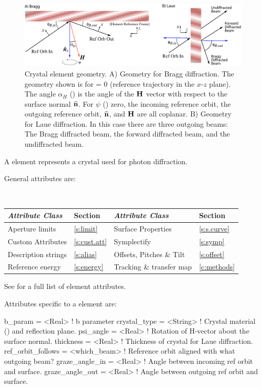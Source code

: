 \begin{figure}[tb]
  \centering
  \includegraphics[width=5in]{crystal-ele.pdf}
  \caption[Crystal element geometry.]
{Crystal element geometry.  A) Geometry for Bragg diffraction. The
geometry shown is for  = 0 (reference trajectory in the
$x$-$z$ plane). The angle $\alpha_H$ () is the angle
of the ${\bf H}$ vector with respect to the surface normal ${\widehat{\bf n}}$. For $\psi$ () zero, the incoming reference orbit,
the outgoing reference orbit, ${\widehat{\bf n}}$, and ${\bf H}$ are all
coplanar. B) Geometry for Laue diffraction. In this case there are
three outgoing beams: The Bragg diffracted beam, the forward
diffracted beam, and the undiffracted beam.}
  \label{f:crystal}
\end{figure}

A  element represents a crystal used for photon diffraction.

General  attributes are:
\begin{center}
\tt
\begin{tabular}{llll} \toprule
  {\sl Attribute Class}      & Section          & {\sl Attribute Class}      & Section         \\ \midrule
  Aperture limits            & \ref{s:limit}    & Surface Properties         & \ref{s:s.curve} \\ 
  Custom Attributes          & \ref{s:cust.att} & Symplectify                & \ref{s:symp}    \\
  Description strings        & \ref{s:alias}    & Offsets, Pitches \& Tilt   & \ref{s:offset}  \\
  Reference energy           & \ref{s:energy}   & Tracking \& transfer map   & \ref{c:methods} \\
  \bottomrule
\end{tabular}
\end{center}
\toffset
See  for a full list of element attributes.

Attributes specific to a  element are:
\begin{example}
  b_param            = <Real>       ! b parameter
  crystal_type       = <String>     ! Crystal material () and reflection plane.
  psi_angle          = <Real>       ! Rotation of H-vector about the surface normal.
  thickness          = <Real>       ! Thickness of crystal for Laue diffraction.
  ref_orbit_follows  = <which_beam> ! Reference orbit aligned with what outgoing beam?
  graze_angle_in     = <Real>       ! Angle between incoming ref orbit and surface.
  graze_angle_out    = <Real>       ! Angle between outgoing ref orbit and surface.
\end{example}

